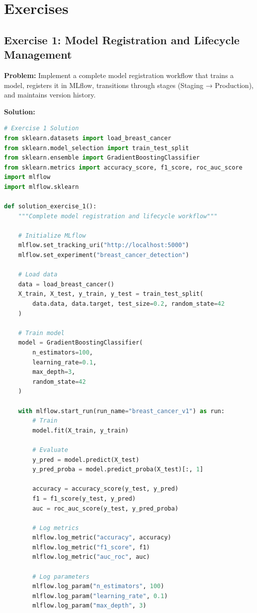 \section{Exercises}

\subsection{Exercise 1: Model Registration and Lifecycle Management}

\textbf{Problem:} Implement a complete model registration workflow that trains a model, registers it in MLflow, transitions through stages (Staging → Production), and maintains version history.

\textbf{Solution:}
\begin{lstlisting}[language=Python]
# Exercise 1 Solution
from sklearn.datasets import load_breast_cancer
from sklearn.model_selection import train_test_split
from sklearn.ensemble import GradientBoostingClassifier
from sklearn.metrics import accuracy_score, f1_score, roc_auc_score
import mlflow
import mlflow.sklearn

def solution_exercise_1():
    """Complete model registration and lifecycle workflow"""

    # Initialize MLflow
    mlflow.set_tracking_uri("http://localhost:5000")
    mlflow.set_experiment("breast_cancer_detection")

    # Load data
    data = load_breast_cancer()
    X_train, X_test, y_train, y_test = train_test_split(
        data.data, data.target, test_size=0.2, random_state=42
    )

    # Train model
    model = GradientBoostingClassifier(
        n_estimators=100,
        learning_rate=0.1,
        max_depth=3,
        random_state=42
    )

    with mlflow.start_run(run_name="breast_cancer_v1") as run:
        # Train
        model.fit(X_train, y_train)

        # Evaluate
        y_pred = model.predict(X_test)
        y_pred_proba = model.predict_proba(X_test)[:, 1]

        accuracy = accuracy_score(y_test, y_pred)
        f1 = f1_score(y_test, y_pred)
        auc = roc_auc_score(y_test, y_pred_proba)

        # Log metrics
        mlflow.log_metric("accuracy", accuracy)
        mlflow.log_metric("f1_score", f1)
        mlflow.log_metric("auc_roc", auc)

        # Log parameters
        mlflow.log_param("n_estimators", 100)
        mlflow.log_param("learning_rate", 0.1)
        mlflow.log_param("max_depth", 3)


\end{lstlisting}

